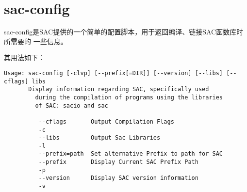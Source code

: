 \section{sac-config}
\label{sec:sac-config}

sac-config是SAC提供的一个简单的配置脚本，用于返回编译、链接SAC函数库时所需要的
一些信息。

其用法如下：
\begin{lstlisting}[style=Shell]
Usage: sac-config [-clvp] [--prefix[=DIR]] [--version] [--libs] [--cflags] libs 
       Display information regarding SAC, specifically used
         during the compilation of programs using the libraries
         of SAC: sacio and sac

          --cflags       Output Compilation Flags
          -c 
          --libs         Output Sac Libraries
          -l
          --prefix=path  Set alternative Prefix to path for SAC
          --prefix       Display Current SAC Prefix Path
          -p
          --version      Display SAC version information
          -v
\end{lstlisting}
